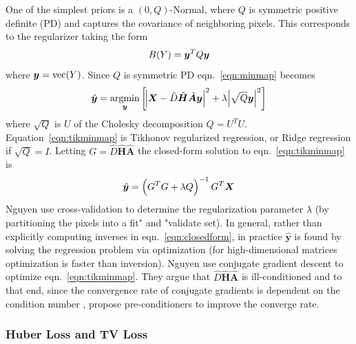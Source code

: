 One of the simplest priors is a \((0, Q)\)-Normal, where \(Q\) is symmetric positive definite (PD) and captures the covariance of neighboring pixels.
%
This corresponds to the regularizer taking the form
\begin{equation}
    B(Y) = \bm{y} ^T Q \bm{y}
\end{equation}
where \(\bm{y} = \text{vec}(Y)\).
%
Since \(Q\) is symmetric PD eqn.~\eqref{eqn:minmap} becomes
\begin{equation}
    \hat{\bm{y}} = \underset{\bm{y}}{\text{argmin}}\left[ \abs{ \bm{X} - \hat{D} \hat{\bm{H}} \hat{\bm{A}} \bm{y} }^2 +\lambda \abs{ \sqrt{Q}\bm{y} }^2 \right]
    \label{eqn:tikminmap}
\end{equation}
where \(\sqrt{Q}\) is \(U\) of the Cholesky decomposition \(Q = U^T U\).
%
Equation~\ref{eqn:tikminmap} is Tikhonov regularized regression, or Ridge regression if \(\sqrt{Q} = I\).
%
Letting \(G = \hat{D} \hat{\bm{H}} \hat{\bm{A}}\) the closed-form solution to eqn.~\eqref{eqn:tikminmap} is
\begin{equation}
    \hat{\by} = \left( G^T G + \lambda Q \right)^{-1} G^T\bX
    \label{eqn:closedform}
\end{equation}
Nguyen \etal \cite{milanfar2001} use cross-validation to determine the regularization parameter \(\lambda\) (by partitioning the pixels into a fit" and "validate set).
%
In general, rather than explicitly computing inverses in eqn.~\eqref{eqn:closedform}, in practice \(\hat{\bm{y}}\) is found by solving the regression problem via optimization (for high-dimensional matrices optimization is faster than inversion).
%
Nguyen \etal use conjugate gradient descent to optimize eqn.~\eqref{eqn:tikminmap}.
%
They argue that \(\hat{D} \hat{\bm{H}} \hat{\bm{A}}\) is ill-conditioned and to that end, since the convergence rate of conjugate gradients is dependent on the condition number \cite{vanderSluis1986}, propose pre-conditioners to improve the converge rate.

\subsubsection{Huber Loss and TV Loss}\label{subsubsec:huberloss}

